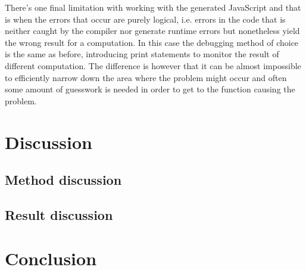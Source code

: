 \documentclass[a4paper]{article}
\begin{document}
There's one final limitation with working with the generated JavaScript and that is when the errors that occur are purely logical, i.e. errors in the code that is neither caught by the compiler nor generate runtime errors but nonetheless yield the wrong result for a computation. In this case the debugging method of choice is the same as before, introducing print statements to monitor the result of different computation. The difference is however that it can be almost impossible to efficiently narrow down the area where the problem might occur and often some amount of guesswork is needed in order to get to the function causing the problem. 


\section{Discussion}
\subsection{Method discussion}
\subsection{Result discussion}

\section{Conclusion}
\end{document}
